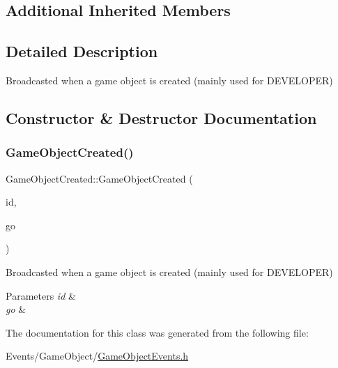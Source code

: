 \subsection*{Additional Inherited Members}


\subsection{Detailed Description}
Broadcasted when a game object is created (mainly used for D\+E\+V\+E\+L\+O\+P\+ER) 

\subsection{Constructor \& Destructor Documentation}
\mbox{\label{classGameObjectCreated_a5e37116ddb39c924a0cda3b8e01ecb31}} 
\subsubsection{\texorpdfstring{Game\+Object\+Created()}{GameObjectCreated()}}
{\footnotesize\ttfamily Game\+Object\+Created\+::\+Game\+Object\+Created (\begin{DoxyParamCaption}\item[{size\+\_\+t}]{id,  }\item[{\hyperlink{classGameObject}{Game\+Object} $\ast$}]{go }\end{DoxyParamCaption})\hspace{0.3cm}{\ttfamily [inline]}}



Broadcasted when a game object is created (mainly used for D\+E\+V\+E\+L\+O\+P\+ER) 


\begin{DoxyParams}{Parameters}
{\em id} & \\
\hline
{\em go} & \\
\hline
\end{DoxyParams}


The documentation for this class was generated from the following file\+:\begin{DoxyCompactItemize}
\item 
Events/\+Game\+Object/\hyperlink{GameObjectEvents_8h}{Game\+Object\+Events.\+h}\end{DoxyCompactItemize}
